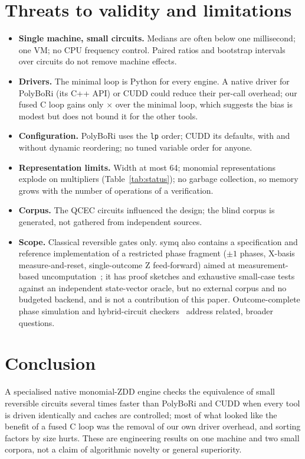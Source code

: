 \documentclass[10pt,a4paper]{article}
\theoremstyle{definition}
\newcommand{\symq}{\textsf{symq}}
\begin{document}
\section{Threats to validity and limitations}\label{sec:limits}

\begin{itemize}
  \item \textbf{Single machine, small circuits.} Medians are often below one millisecond; one
  VM; no CPU frequency control. Paired ratios and bootstrap intervals over circuits do not
  remove machine effects.
  \item \textbf{Drivers.} The minimal loop is Python for every engine. A native driver for
  PolyBoRi (its C++ API) or CUDD could reduce their per-call overhead; our fused C loop gains
  only \QFusionSim$\times$ over the minimal loop, which suggests the bias is modest but does
  not bound it for the other tools.
  \item \textbf{Configuration.} PolyBoRi uses the \texttt{lp} order; CUDD its defaults, with and
  without dynamic reordering; no tuned variable order for anyone.
  \item \textbf{Representation limits.} Width at most 64; monomial representations explode on
  multipliers (Table~\ref{tab:status}); no garbage collection, so memory grows with the
  number of operations of a verification.
  \item \textbf{Corpus.} The QCEC circuits influenced the design; the blind corpus is
  generated, not gathered from independent sources.
  \item \textbf{Scope.} Classical reversible gates only. \symq{} also contains a specification
  and reference implementation of a restricted phase fragment ($\pm1$ phases, X-basis
  measure-and-reset, single-outcome Z feed-forward) aimed at measurement-based
  uncomputation~\cite{gidney2018halving}; it has proof sketches and exhaustive small-case
  tests against an independent state-vector oracle, but no external corpus and no budgeted
  backend, and is not a contribution of this paper. Outcome-complete phase simulation and
  hybrid-circuit checkers~\cite{kliuchnikov2026phased,ricciardi2025hybrid,ke2026irene}
  address related, broader questions.
\end{itemize}

\section{Conclusion}

A specialised native monomial-ZDD engine checks the equivalence of small reversible circuits
several times faster than PolyBoRi and CUDD when every tool is driven identically and caches
are controlled; most of what looked like the benefit of a fused C loop was the removal of our
own driver overhead, and sorting factors by size hurts. These are engineering results on one
machine and two small corpora, not a claim of algorithmic novelty or general superiority.
\end{document}
